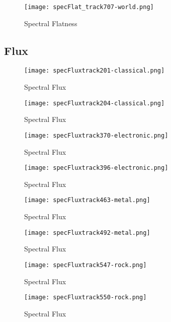 \documentclass{article} %
\begin{document}
\begin{figure}[H]
\centering
\texttt{[image: specFlat\_track707-world.png]}
\caption{Spectral Flatness}
\label{fig:flat707}
\end{figure}



\subsection{Flux}

\begin{figure}[H]
\centering
\texttt{[image: specFluxtrack201-classical.png]}
\caption{Spectral Flux}
\label{fig:flux201}
\end{figure}

\begin{figure}[H]
\centering
\texttt{[image: specFluxtrack204-classical.png]}
\caption{Spectral Flux}
\label{fig:flux204}
\end{figure}

\begin{figure}[H]
\centering
\texttt{[image: specFluxtrack370-electronic.png]}
\caption{Spectral Flux}
\label{fig:flux370}
\end{figure}


\begin{figure}[H]
\centering
\texttt{[image: specFluxtrack396-electronic.png]}
\caption{Spectral Flux}
\label{fig:flux396}
\end{figure}


\begin{figure}[H]
\centering
\texttt{[image: specFluxtrack463-metal.png]}
\caption{Spectral Flux}
\label{fig:flux463}
\end{figure}


\begin{figure}[H]
\centering
\texttt{[image: specFluxtrack492-metal.png]}
\caption{Spectral Flux}
\label{fig:flux492}
\end{figure}


\begin{figure}[H]
\centering
\texttt{[image: specFluxtrack547-rock.png]}
\caption{Spectral Flux}
\label{fig:flux547}
\end{figure}


\begin{figure}[H]
\centering
\texttt{[image: specFluxtrack550-rock.png]}
\caption{Spectral Flux}
\label{fig:flux550}
\end{figure}
\end{document}
